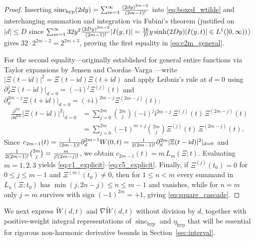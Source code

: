 \documentclass[11pt,a4paper,reqno]{amsart}
\theoremstyle{definition}
\theoremstyle{remark}
\numberwithin{equation}{section}
\newcommand{\ii}{\mathrm{i}}
\newcommand{\Wtil}{\widetilde{W}}
\newcommand{\sinch}{\operatorname{sinc}_{\mathrm{hyp}}}
\newcommand{\etah}{\eta_{\mathrm{hyp}}}
\newcommand{\fac}{\mathclose{\mathchar"0021}}
\begin{document}
\begin{proof}
Inserting $\sinch(2d y) = \sum_{m=1}^\infty \frac{(2d y)^{2m-2}}{(2m-1)\fac}$ into \eqref{eq:boxed_wtilde} and interchanging summation and integration via Fubini's theorem (justified on $|d| \le D$ since $\sum_{m=1}^\infty 32 y^2 \frac{(2D y)^{2m-2}}{(2m-1)\fac}|I(y,t)| = \frac{16}{D}y\sinh(2D y)|I(y,t)| \in L^1([0,\infty))$) gives $32\cdot 2^{2m-2} = 2^{2m+3}$, proving the first equality in \eqref{eq:c2m_general}.

For the second equality---originally established for general entire functions via Taylor expansions by Jensen \cite{Jensen1913} and Csordas--Varga \cite[Theorem~2.1]{CsordasVarga1990}---write $|\Xi(t-\ii d)|^2 = \Xi(t-\ii d)\Xi(t+\ii d)$ and apply Leibniz's rule at $d = 0$ using $\partial_d^j\Xi(t-\ii d)|_{d=0} = (-\ii)^j\Xi^{(j)}(t)$ and $\partial_d^{2m-j}\Xi(t+\ii d)|_{d=0} = (+\ii)^{2m-j}\Xi^{(2m-j)}(t)$:
\[
\begin{aligned}
\frac{\partial^{2m}}{\partial d^{2m}}\big|\Xi(t-\ii d)\big|^2\Big|_{d=0}
&= \sum_{j=0}^{2m}\binom{2m}{j}(-\ii)^j \ii^{2m-j}\,\Xi^{(j)}(t)\,\Xi^{(2m-j)}(t) \\
&= \sum_{j=0}^{2m}(-1)^{m+j}\binom{2m}{j}\Xi^{(j)}(t)\,\Xi^{(2m-j)}(t).
\end{aligned}
\]
Since $c_{2m-1}(t) = \frac{1}{(2m-1)\fac}\partial_d^{2m-1}W(0,t) = \frac{1}{2(2m-1)\fac}\partial_d^{2m}|\Xi(t-\ii d)|^2|_{d=0}$ and $\frac{1}{2(2m-1)\fac}\binom{2m}{j} = \frac{m}{j\fac(2m-j)\fac}$, we obtain $c_{2m-1}(t) = m\,L_m(\Xi;t)$. Evaluating $m = 1, 2, 3$ yields \eqref{eq:c1_explicit}--\eqref{eq:c5_explicit}. Finally, if $\Xi^{(j)}(t_0) = 0$ for $0 \le j \le m-1$ and $\Xi^{(m)}(t_0) \neq 0$, then for $1 \le n < m$ every summand in $L_n(\Xi;t_0)$ has $\min(j, 2n-j) \le n \le m-1$ and vanishes, while for $n = m$ only $j = m$ survives with sign $(-1)^{2m} = +1$, giving \eqref{eq:square_cascade}.
\end{proof}

We next express $\Wtil(d,t)$ and $\nabla\Wtil(d,t)$ without division by $d$, together with positive-weight integral representations of $\sinch$ and $\etah$ that will be essential for rigorous non-harmonic derivative bounds in Section~\ref{sec:interval}.
\end{document}
